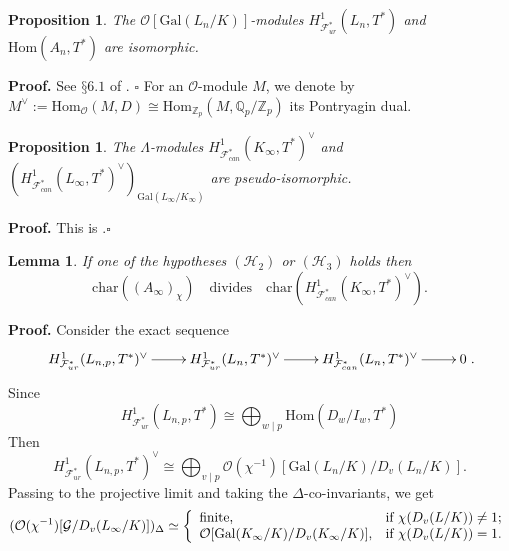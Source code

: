 \documentclass[reqno]{amsart}
\newcounter{dummy} \numberwithin{dummy}{section}
\newtheorem{lem}[dummy]{Lemma}
\newtheorem{pro}[dummy]{Proposition}
\begin{document}
\begin{pro}\label{proposition class group and Fur}
The $\mathcal{O}[\mathrm{Gal}(L_{n}/K)]$-modules
$H^{1}_{\mathcal{F}_{ur}^{\ast}}(L_{n},T^{\ast})$ and
$\mathrm{Hom}(A_{n},T^{\ast})$ are isomorphic.
\end{pro}
\noindent \textbf{Proof.} See $§ 6.1$ of \cite{MR04}.\hfill
$\square$\vskip 5pt
 For an $\mathcal{O}$-module $M$, we denote by $M^{\vee}:=\mathrm{Hom}_{\mathcal{O}}(M,D)\cong
  \mathrm{Hom}_{\mathbb{Z}_{p}}(M,\mathbb{Q}_{p}/\mathbb{Z}_{p})$ its
  Pontryagin dual.
\begin{pro}\label{Proposition Fcan pseudo isomo to co inv}
The $\Lambda$-modules
$H^{1}_{\mathcal{F}^{\ast}_{can}}(K_{\infty},T^{\ast})^{\vee}$ and
$(H^{1}_{\mathcal{F}^{\ast}_{can}}(L_{\infty},T^{\ast})^{\vee})_{\mathrm{Gal}(L_{\infty}/K_{\infty})}$
are pseudo-isomorphic.
\end{pro}
\noindent \textbf{Proof.} This is \cite[Proposition
3.8]{AMO1}.\hfill $\square$
\begin{lem}\label{chi quotient of class group and canonique
conditio} If one of the hypotheses $(\mathcal{H}_{2})$ or
$(\mathcal{H}_{3})$ holds then
$$
\mathrm{char}((A_{\infty})_{\chi})\quad\mbox{divides}\quad
\mathrm{char}(H^{1}_{\mathcal{F}^{\ast}_{can}}(K_{\infty},T^{\ast})^{\vee}).
$$
\end{lem}
\noindent \textbf{Proof.} Consider the exact sequence
$$
\xymatrix@=2pc{H^{1}_{\mathcal{F}_{ur}^{\ast}}(L_{n,p},T^{\ast})^{\vee}\ar[r]&
H^{1}_{\mathcal{F}_{ur}^{\ast}}(L_{n},T^{\ast})^{\vee}\ar[r]&
H^{1}_{\mathcal{F}_{can}^{\ast}}(L_{n},T^{\ast})^{\vee}\ar[r]&0}.
$$
Since
$$
H^{1}_{\mathcal{F}_{ur}^{\ast}}(L_{n,p},T^{\ast})\cong
\bigoplus_{w\mid p}\mathrm{Hom}(D_{w}/I_{w},T^{\ast})
$$
 Then
$$
H^{1}_{\mathcal{F}_{ur}^{\ast}}(L_{n,p},T^{\ast})^{\vee}\cong
\bigoplus_{v\mid
p}\mathcal{O}(\chi^{-1})[\mathrm{Gal}(L_{n}/K)/D_{v}(L_{n}/K)].
$$
Passing to the projective limit and taking the
$\Delta$-co-invariants, we get
$$
(\mathcal{O}(\chi^{-1})[\mathcal{G}/D_{v}(L_{\infty}/K)])_{\Delta}\simeq\left\{
                                                                          \begin{array}{ll}
                                                                            \mbox{finite}, & \hbox{if $\chi(D_{v}(L/K))\neq 1$;} \\
                                                                            \mathcal{O}[\mathrm{Gal}(K_{\infty}/K)/D_{v}(K_{\infty}/K)],
                                                                             & \hbox{if  $\chi(D_{v}(L/K))=1$.}
                                                                          \end{array}
                                                                        \right.
$$
\end{document}
